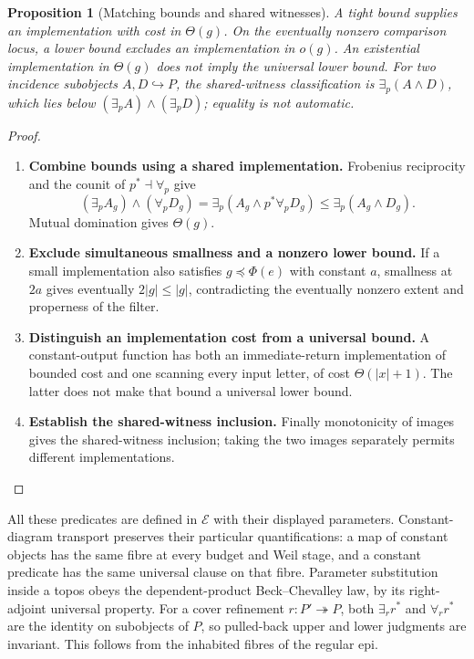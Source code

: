 \documentclass[11pt,a4paper]{article}
\numberwithin{algorithm}{section}
\numberwithin{equation}{section}
\newtheorem{proposition}[proposition]{Proposition}
\theoremstyle{definition}
\theoremstyle{remark}
\theoremstyle{plain}
\newcommand{\E}{\mathcal E}
\newcommand{\incl}{\hookrightarrow}
\newcommand{\onto}{\twoheadrightarrow}
\theoremstyle{definition}
\theoremstyle{plain}
\begin{document}
\begin{proposition}[Matching bounds and shared witnesses]
\label{prop:matching}
A tight bound supplies an implementation with cost in $\Theta(g)$.
On the eventually nonzero comparison locus, a lower bound excludes
an implementation in $o(g)$. An existential implementation in
$\Theta(g)$ does not imply the universal lower bound.
For two incidence subobjects $A,D\incl P$, the shared-witness
classification is $\exists_p(A\wedge D)$, which lies below
$(\exists_pA)\wedge(\exists_pD)$; equality is not automatic.
\end{proposition}
\begin{proof}\leavevmode
\begin{enumerate}[leftmargin=*,align=left]
\item \textbf{Combine bounds using a shared implementation.}
Frobenius reciprocity and the counit of $p^*\dashv\forall_p$ give
\[
 (\exists_pA_g)\wedge(\forall_pD_g)
 =\exists_p(A_g\wedge p^*\forall_pD_g)
 \le\exists_p(A_g\wedge D_g).
\]
Mutual domination gives $\Theta(g)$.

\item \textbf{Exclude simultaneous smallness and a nonzero lower bound.}
If a small implementation
also satisfies $g\preceq\Phi(e)$ with constant $a$, smallness
at $2a$ gives eventually $2|g|\le|g|$, contradicting the
eventually nonzero extent and properness of the filter.

\item \textbf{Distinguish an implementation cost from a universal bound.}
A constant-output function has both an immediate-return
implementation of bounded cost and one scanning every input
letter, of cost $\Theta(|x|+1)$. The latter does not make that
bound a universal lower bound.

\item \textbf{Establish the shared-witness inclusion.}
Finally monotonicity of images
gives the shared-witness inclusion; taking the two images
separately permits different implementations.
\end{enumerate}
\end{proof}

All these predicates are defined in $\E$ with their displayed
parameters. Constant-diagram transport preserves their particular
quantifications: a map of constant objects has the same fibre at
every budget and Weil stage, and a constant predicate has the same
universal clause on that fibre. Parameter substitution inside a
topos obeys the dependent-product Beck--Chevalley law, by its
right-adjoint universal property.
For a cover refinement $r:P'\onto P$, both
$\exists_r r^*$ and $\forall_r r^*$ are the identity on
subobjects of $P$, so pulled-back upper and lower judgments
are invariant. This follows from the inhabited fibres of the regular epi.
\end{document}
